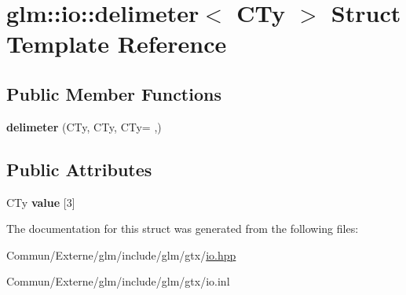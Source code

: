 \hypertarget{structglm_1_1io_1_1delimeter}{}\section{glm\+:\+:io\+:\+:delimeter$<$ C\+Ty $>$ Struct Template Reference}
\label{structglm_1_1io_1_1delimeter}
\subsection*{Public Member Functions}
\begin{DoxyCompactItemize}
\item 
{\bfseries delimeter} (C\+Ty, C\+Ty, C\+Ty= \textquotesingle{},\textquotesingle{})\hypertarget{structglm_1_1io_1_1delimeter_acd4b6e1e816d423a069688c4772b9500}{}\label{structglm_1_1io_1_1delimeter_acd4b6e1e816d423a069688c4772b9500}

\end{DoxyCompactItemize}
\subsection*{Public Attributes}
\begin{DoxyCompactItemize}
\item 
C\+Ty {\bfseries value} \mbox{[}3\mbox{]}\hypertarget{structglm_1_1io_1_1delimeter_a9ade129dae50c4f716f724e7425f9c68}{}\label{structglm_1_1io_1_1delimeter_a9ade129dae50c4f716f724e7425f9c68}

\end{DoxyCompactItemize}


The documentation for this struct was generated from the following files\+:\begin{DoxyCompactItemize}
\item 
Commun/\+Externe/glm/include/glm/gtx/\hyperlink{io_8hpp}{io.\+hpp}\item 
Commun/\+Externe/glm/include/glm/gtx/io.\+inl\end{DoxyCompactItemize}
